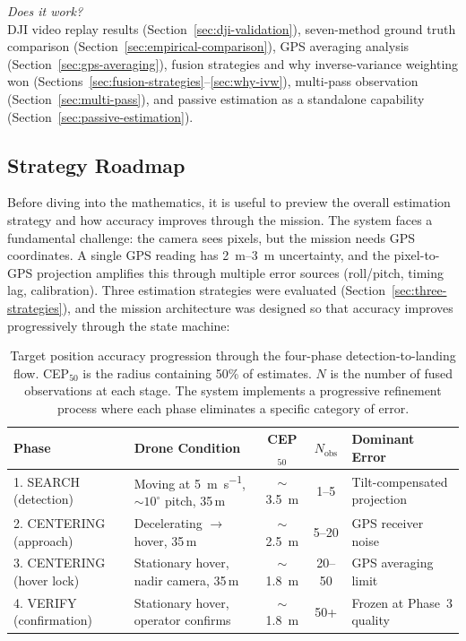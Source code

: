 \begin{description}[leftmargin=1.8em, labelindent=0em, font=\bfseries]
\item[Part~VII --- Validation] \emph{Does it work?}\\
  DJI video replay results (Section~\ref{sec:dji-validation}), seven-method ground truth comparison (Section~\ref{sec:empirical-comparison}), GPS averaging analysis (Section~\ref{sec:gps-averaging}), fusion strategies and why inverse-variance weighting won (Sections~\ref{sec:fusion-strategies}--\ref{sec:why-ivw}), multi-pass observation (Section~\ref{sec:multi-pass}), and passive estimation as a standalone capability (Section~\ref{sec:passive-estimation}).

\end{description}

\subsection{Strategy Roadmap}\label{sec:strategy-roadmap}

Before diving into the mathematics, it is useful to preview the overall estimation strategy and how accuracy improves through the mission.  The system faces a fundamental challenge: the camera sees pixels, but the mission needs GPS coordinates.  A single GPS reading has \SIrange{2}{3}{\metre} uncertainty, and the pixel-to-GPS projection amplifies this through multiple error sources (roll/pitch, timing lag, calibration).  Three estimation strategies were evaluated (Section~\ref{sec:three-strategies}), and the mission architecture was designed so that accuracy improves progressively through the state machine:

\begin{table}[ht]
  \centering
  \caption{Target position accuracy progression through the four-phase detection-to-landing flow.  CEP$_{50}$ is the radius containing 50\% of estimates.  $N$ is the number of fused observations at each stage.  The system implements a progressive refinement process where each phase eliminates a specific category of error.}
  \label{tab:accuracy-progression}
  \small
  \begin{tabular}{llccl}
    \toprule
    \textbf{Phase} & \textbf{Drone Condition} & \textbf{CEP$_{50}$} & \textbf{$N_\mathrm{obs}$} & \textbf{Dominant Error} \\
    \midrule
    1. SEARCH (detection)  & Moving at \SI{5}{\metre\per\second}, $\sim$$10^{\circ}$ pitch, 35\,m & $\sim$\SI{3.5}{\metre} & 1--5     & Tilt-compensated projection \\
    2. CENTERING (approach) & Decelerating $\to$ hover, 35\,m   & $\sim$\SI{2.5}{\metre} & 5--20    & GPS receiver noise \\
    3. CENTERING (hover lock)  & Stationary hover, nadir camera, 35\,m  & $\sim$\SI{1.8}{\metre} & 20--50 & GPS averaging limit \\
    4. VERIFY (confirmation) & Stationary hover, operator confirms & $\sim$\SI{1.8}{\metre} & 50+ & Frozen at Phase~3 quality \\
    \bottomrule
  \end{tabular}
\end{table}

